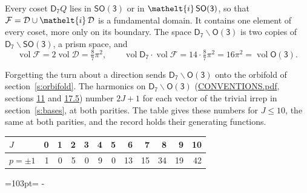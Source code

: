 \documentclass[10pt,a4paper]{article}
\newcommand{\needspace}[1]{\par\penalty-100\begingroup\dimen0=#1\relax\dimen2=\pagegoal
  \advance\dimen2-\pagetotal\ifdim\dimen0>\dimen2\relax\ifdim\dimen2>0pt\vfil\break\fi\fi
  \endgroup}
\numberwithin{equation}{section}
\newcommand{\eltfont}[1]{{\let\sigma\eltsigma\mathelt{#1}}}
\newcommand{\grp}[1]{\mathsf{#1}}
\newcommand{\elt}[1]{\eltfont{#1}}
\newcommand{\vol}{\operatorname{vol}}
\newcommand{\fcell}{\mathcal{D}}
\newcommand{\fdomain}{\mathcal{F}}
\begin{document}
\leavevmode\label{n:set.fundamental}Every coset $\grp{D_{7}}Q$ lies in \href{SO3.pdf}{$\grp{SO(3)}$} or in $\elt{i}\,\grp{SO(3)}$, so that $\fdomain = \fcell \cup \elt{i}\,\fcell$ is a fundamental domain. It contains one element of every coset, more only on its boundary.
The space $\grp{D_{7}}\backslash\grp{O(3)}$ is two copies of $\grp{D_{7}}\backslash\grp{SO(3)}$, a prism space, and
\begin{equation}\label{e:volume}\vol\fdomain = 2\vol\fcell = \tfrac{8}{7}\pi^2,\qquad \vol\grp{D_{7}}\cdot\vol\fdomain = 14\cdot \tfrac{8}{7}\pi^2 = 16\pi^2 = \vol\grp{O(3)}.\end{equation}

Forgetting the turn about a direction sends $\grp{D_{7}}\backslash\grp{O(3)}$ onto the orbifold of section~\ref{s:orbifold}.
The harmonics on $\grp{D_{7}}\backslash\grp{O(3)}$ (\href{../../CONVENTIONS.pdf}{CONVENTIONS.pdf}, sections \href{../../CONVENTIONS.pdf\#conv.11}{11} and \href{../../CONVENTIONS.pdf\#conv.17.5}{17.5}) number $2J + 1$ for each vector of the trivial irrep in section~\ref{s:bases}, at both parities. The table gives these numbers for $J \le 10$, the same at both parities, and the record holds their generating functions.
{\small\setlength{\tabcolsep}{4pt}\begin{longtable}{@{}lrrrrrrrrrrr@{}}\toprule
$J$ & 0 & 1 & 2 & 3 & 4 & 5 & 6 & 7 & 8 & 9 & 10\\\midrule\endhead
\bottomrule\endfoot\endlastfoot
$p = \pm 1$ & 1 & 0 & 5 & 0 & 9 & 0 & 13 & 15 & 34 & 19 & 42\\
\bottomrule\end{longtable}}
\needspace{103pt}
\end{document}
